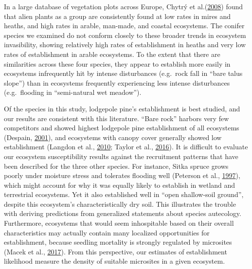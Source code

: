 \documentclass[
]{article}
\begin{document}
In a large database of vegetation plots across Europe, Chytrý et al.(\protect\hyperlink{ref-chytryHabitatInvasionsAlien2008}{2008}) found that alien plants as a group are consistently found at low rates in mires and heaths, and high rates in arable, man-made, and coastal ecosystems.
The conifer species we examined do not conform closely to these broader trends in ecosystem invasibility, showing relatively high rates of establishment in heaths and very low rates of establishment in arable ecosystems.
To the extent that there are similarities across these four species, they appear to establish more easily in ecosystems infrequently hit by intense disturbances (e.g.~rock fall in ``bare talus slope'') than in ecosystems frequently experiencing less intense disturbances (e.g.~flooding in ``semi-natural wet meadow'').

Of the species in this study, lodgepole pine's establishment is best studied, and our results are consistent with this literature.
``Bare rock'' harbors very few competitors and showed highest lodgepole pine establishment of all ecosystems (Despain, \protect\hyperlink{ref-despainDispersalEcologyLodgepole2001}{2001}), and ecosystems with canopy cover generally showed low establishment (Langdon et al., \protect\hyperlink{ref-langdonPinusContortaInvasion2010}{2010}; Taylor et al., \protect\hyperlink{ref-taylorDriversPlantInvasion2016}{2016}).
It is difficult to evaluate our ecosystem susceptibility results against the recruitment patterns that have been described for the three other species.
For instance, Sitka spruce grows poorly under moisture stress and tolerates flooding well (Peterson et al., \protect\hyperlink{ref-petersonEcologyManagementSitka1997}{1997}), which might account for why it was equally likely to establish in wetland and terrestrial ecosystems.
Yet it also established well in ``open shallow-soil ground'', despite this ecosystem's characteristically dry soil.
This illustrates the trouble with deriving predictions from generalized statements about species autecology.
Furthermore, ecosystems that would seem inhospitable based on their overall characteristics may actually contain many localized opportunities for establishment, because seedling mortality is strongly regulated by microsites (Macek et al., \protect\hyperlink{ref-macekLifeDeathPicea2017}{2017}).
From this perspective, our estimates of establishment likelihood measure the density of suitable microsites in a given ecosystem.
\end{document}

